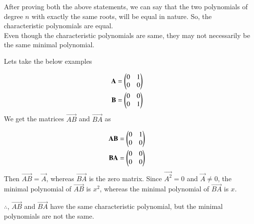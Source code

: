 \documentclass[journal,12pt,twocolumn]{IEEEtran}
\begin{document}
	After proving both the above statements, we can say that the two polynomials of degree $n$ with exactly the same roots, will be equal in nature. So, the characteristic polynomials are equal. \\
	
	Even though the characteristic polynomials are same, they may not necessarily be the same minimal polynomial.
	
	Lets take the below examples
	
	\begin{align}
		\mathbf{A} = \begin{pmatrix}0&1\\0&0\end{pmatrix} \\
		\mathbf{B} = \begin{pmatrix}0&0\\0&1\end{pmatrix}
	\end{align}
	We get the matrices $\vec{AB}$ and $\vec{BA}$ as
	
	\begin{align}
		\mathbf{AB} = \begin{pmatrix}0&1\\0&0\end{pmatrix} \\
		\mathbf{BA} = \begin{pmatrix}0&0\\0&0\end{pmatrix}
	\end{align}
	Then $\vec{AB} = \vec{A}$, whereas $\vec{BA}$ is the zero matrix. Since $\vec{A^2} = 0$ and $\vec{A} \neq 0$, the minimal polynomial of $\vec{AB}$ is $x^2$, whereas the minimal polynomial of $\vec{BA}$ is $x$.
	
	$\therefore$, $\vec{AB}$ and $\vec{BA}$ have the same characteristic polynomial, but the minimal polynomials are not the same.
	
	
\end{document}
